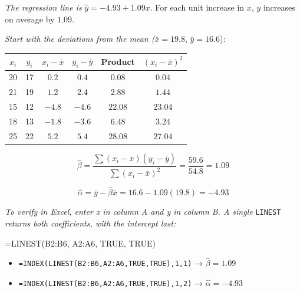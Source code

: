 \documentclass[
  11pt,
  letterpaper,
  DIV=11,
  numbers=noendperiod,
  oneside,
  open=any]{scrreprt}
\newenvironment{Shaded}{\begin{snugshade}}{\end{snugshade}}
\newcommand{\NormalTok}[1]{\textcolor[rgb]{0.00,0.23,0.31}{#1}}
\providecommand{\tightlist}{%
  \setlength{\itemsep}{0pt}\setlength{\parskip}{0pt}}\usepackage{longtable,booktabs,array}
\newenvironment{bsanswerkey}[2]{%
  \begin{tcolorbox}[bsbase, colback=bspaper2, colframe=bsline, fontupper=\small,
    title={\hypertarget{a-#1}{}\label{a-#1}\hyperlink{q-#1}{\textcolor{bsink2}{\MakeUppercase{#2}}}\hfill
      \hyperlink{q-#1}{\textcolor{bsaccent}{\normalfont\footnotesize back to page \pageref{q-#1}}}}]}%
  {\end{tcolorbox}}
\begin{document}
\begin{bsanswerkey}{bsans59}{Exercise 1, question 1}

\emph{The regression line is} \(\hat{y}=-4.93+1.09x\). For each unit
increase in \(x\), \(y\) increases on average by \(1.09\).

\emph{Start with the deviations from the mean (}\(\bar{x}=19.8\),
\(\bar{y}=16.6\)):

\begin{center}
\begin{tabular}{cccccc}
\toprule
\(x_i\) & \(y_i\) & \(x_i-\bar{x}\) & \(y_i-\bar{y}\) & Product & \((x_i-\bar{x})^2\) \\
\midrule
20 & 17 & \(0.2\) & \(0.4\) & \(0.08\) & \(0.04\) \\
21 & 19 & \(1.2\) & \(2.4\) & \(2.88\) & \(1.44\) \\
15 & 12 & \(-4.8\) & \(-4.6\) & \(22.08\) & \(23.04\) \\
18 & 13 & \(-1.8\) & \(-3.6\) & \(6.48\) & \(3.24\) \\
25 & 22 & \(5.2\) & \(5.4\) & \(28.08\) & \(27.04\) \\
\bottomrule
\end{tabular}
\end{center}

\[\hat{\beta}=\frac{\sum(x_i-\bar{x})(y_i-\bar{y})}{\sum(x_i-\bar{x})^2}=\frac{59.6}{54.8}=1.09\]

\[\hat{\alpha}=\bar{y}-\hat{\beta}\bar{x}=16.6-1.09(19.8)=-4.93\]

\emph{To verify in Excel, enter x in column A and y in column B. A
single} \texttt{LINEST} \emph{returns both coefficients, with the
intercept last:}

\begin{Shaded}
\begin{Highlighting}[]
\NormalTok{=LINEST(B2:B6, A2:A6, TRUE, TRUE)}
\end{Highlighting}
\end{Shaded}

\begin{itemize}
\tightlist
\item
  \texttt{=INDEX(LINEST(B2:B6,A2:A6,TRUE,TRUE),1,1)} →
  \(\hat{\beta}=1.09\)
\item
  \texttt{=INDEX(LINEST(B2:B6,A2:A6,TRUE,TRUE),1,2)} →
  \(\hat{\alpha}=-4.93\)
\end{itemize}

\end{bsanswerkey}
\end{document}
